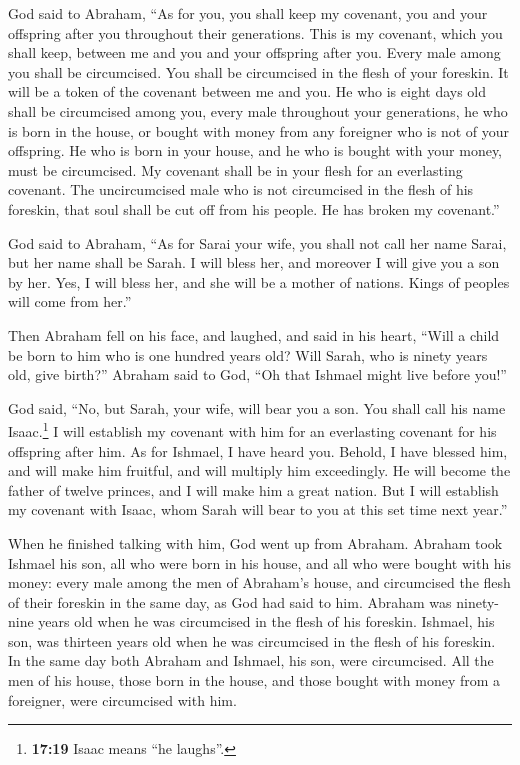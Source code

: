  God said to Abraham, ``As for you, you shall keep my
covenant, you and your offspring after you throughout their generations.
 This is my covenant, which you shall keep, between me
and you and your offspring after you. Every male among you shall be
circumcised.  You shall be circumcised in the flesh of
your foreskin. It will be a token of the covenant between me and you.
 He who is eight days old shall be circumcised among you,
every male throughout your generations, he who is born in the house, or
bought with money from any foreigner who is not of your offspring.
 He who is born in your house, and he who is bought with
your money, must be circumcised. My covenant shall be in your flesh for
an everlasting covenant.  The uncircumcised male who is
not circumcised in the flesh of his foreskin, that soul shall be cut off
from his people. He has broken my covenant.''

 God said to Abraham, ``As for Sarai your wife, you shall
not call her name Sarai, but her name shall be Sarah.  I
will bless her, and moreover I will give you a son by her. Yes, I will
bless her, and she will be a mother of nations. Kings of peoples will
come from her.''

 Then Abraham fell on his face, and laughed, and said in
his heart, ``Will a child be born to him who is one hundred years old?
Will Sarah, who is ninety years old, give birth?'' 
Abraham said to God, ``Oh that Ishmael might live before you!''

 God said, ``No, but Sarah, your wife, will bear you a
son. You shall call his name Isaac.\footnote{\textbf{17:19} Isaac means
  ``he laughs''.} I will establish my covenant with him for an
everlasting covenant for his offspring after him.  As for
Ishmael, I have heard you. Behold, I have blessed him, and will make him
fruitful, and will multiply him exceedingly. He will become the father
of twelve princes, and I will make him a great nation. 
But I will establish my covenant with Isaac, whom Sarah will bear to you
at this set time next year.''

 When he finished talking with him, God went up from
Abraham.  Abraham took Ishmael his son, all who were born
in his house, and all who were bought with his money: every male among
the men of Abraham's house, and circumcised the flesh of their foreskin
in the same day, as God had said to him.  Abraham was
ninety-nine years old when he was circumcised in the flesh of his
foreskin.  Ishmael, his son, was thirteen years old when
he was circumcised in the flesh of his foreskin.  In the
same day both Abraham and Ishmael, his son, were circumcised.
 All the men of his house, those born in the house, and
those bought with money from a foreigner, were circumcised with him.

